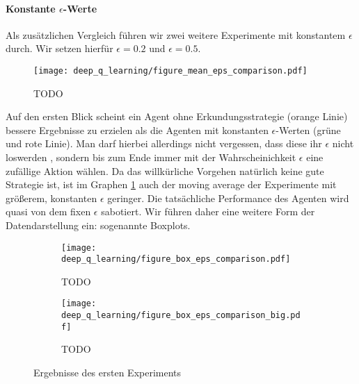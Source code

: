 \paragraph{Konstante $ \epsilon $-Werte}
Als zusätzlichen Vergleich führen wir zwei weitere Experimente mit konstantem $ \epsilon $ durch. Wir setzen hierfür $ \epsilon = 0.2 $ und $ \epsilon = 0.5 $.
\begin{figure}[H]
    \centering
    \texttt{[image: deep\_q\_learning/figure\_mean\_eps\_comparison.pdf]}
    \caption{TODO} \label{img:graphEpsComparison}
\end{figure}
Auf den ersten Blick scheint ein Agent ohne Erkundungsstrategie (orange Linie) bessere Ergebnisse zu erzielen als die Agenten mit konstanten $ \epsilon $-Werten (grüne und rote Linie). Man darf hierbei allerdings nicht vergessen, dass diese ihr $ \epsilon $ nicht \glqq loswerden \grqq{}, sondern bis zum Ende immer mit der Wahrscheinichkeit $ \epsilon $ eine zufällige Aktion wählen. Da das willkürliche Vorgehen natürlich keine gute Strategie ist, ist im Graphen \ref{img:graphEpsComparison} auch der moving average der Experimente mit größerem, konstanten $ \epsilon $ geringer. Die tatsächliche Performance des Agenten wird quasi von dem fixen $ \epsilon $ sabotiert. Wir führen daher eine weitere Form der Datendarstellung ein: sogenannte Boxplots.
\begin{figure}[h!]
    \centering
    \begin{subfigure}[b]{0.7\textwidth}
        \texttt{[image: deep\_q\_learning/figure\_box\_eps\_comparison.pdf]}
        \caption{TODO}
        \label{img:graphBoxEpsComparison}
    \end{subfigure}
    \begin{subfigure}[b]{0.7\textwidth}
        \texttt{[image: deep\_q\_learning/figure\_box\_eps\_comparison\_big.pdf]}
        \caption{TODO}
        \label{img:graphBoxEpsComparisonBig}
    \end{subfigure}
    \caption{Ergebnisse des ersten Experiments}
    \label{img:graphBoxEpsComparisonBoth}
\end{figure}


